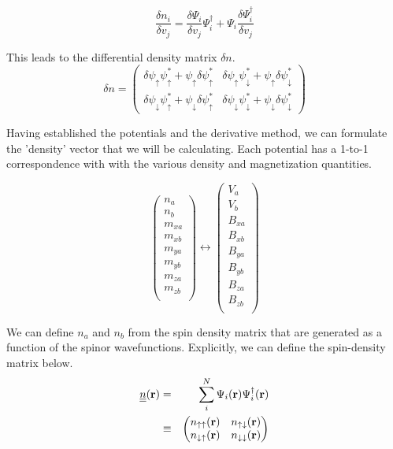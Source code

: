\documentclass[10pt]{revtex4-1}
\newcommand{\bfr}{{\bf r}}
\newcommand{\ua}{\uparrow}
\newcommand{\da}{\downarrow}
\begin{document}
\begin{equation}
  \frac{\delta n_i}{\delta v_j} = \frac{\delta \Psi_i}{\delta v_j} \Psi_i^{\dagger} + \Psi_i \frac{\delta \Psi_i^{\dagger}}{\delta v_j}
\end{equation}

This leads to the differential density matrix $\delta n$.
\begin{equation}
  \delta n =
  \begin{pmatrix}
    \delta \psi_{\ua} \psi_{\ua}^* + \psi_{\ua} \delta \psi_{\ua}^* &
    \delta \psi_{\ua} \psi_{\da}^* + \psi_{\ua} \delta \psi_{\da}^* \\
    \delta \psi_{\da} \psi_{\ua}^* + \psi_{\da} \delta \psi_{\ua}^* &
    \delta \psi_{\da} \psi_{\da}^* + \psi_{\da} \delta \psi_{\da}^*
  \end{pmatrix}
\end{equation}

Having established the potentials and the derivative method, we can formulate the 'density' vector that we will be calculating. Each potential has a 1-to-1 correspondence with with the various density and magnetization quantities.

\begin{equation}
  \begin{pmatrix}
    n_a \\
    n_b \\
    m_{xa} \\
    m_{xb} \\
    m_{ya} \\
    m_{yb} \\
    m_{za} \\
    m_{zb} \\
  \end{pmatrix}
  \longleftrightarrow
  \begin{pmatrix}
    V_a \\
    V_b \\
    B_{xa} \\
    B_{xb} \\
    B_{ya} \\
    B_{yb} \\
    B_{za} \\
    B_{zb} \\
  \end{pmatrix}
\end{equation}

We can define $n_a$ and $n_b$ from the spin density matrix that are generated as a function of the spinor wavefunctions. Explicitly, we can define the spin-density matrix below.
\begin{eqnarray*}
  \underline{\underline{n}}(\bfr) &=& \sum_i^N \Psi_i(\bfr) \Psi_i^{\dagger}(\bfr) \\
  &\equiv&
  \begin{pmatrix}
    n_{\ua \ua}(\bfr) & n_{\ua \da}(\bfr) \\
    n_{\da \ua}(\bfr) & n_{\da \da}(\bfr) \\
  \end{pmatrix}
\end{eqnarray*}
\end{document}
